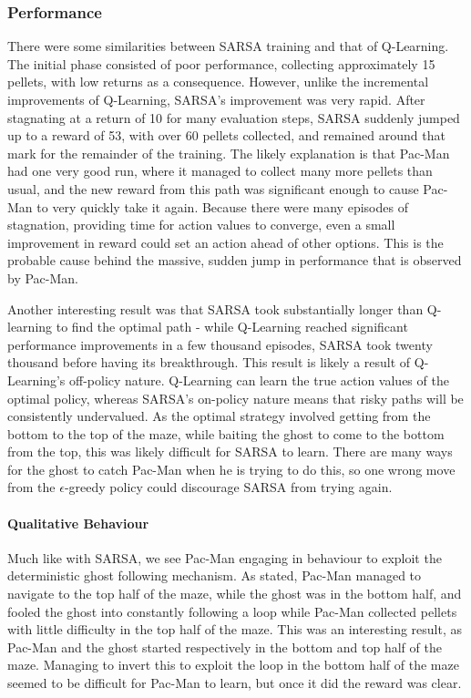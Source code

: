 \documentclass{article}
\begin{document}
\subsubsection{Performance}
There were some similarities between SARSA training and that of Q-Learning. The initial phase consisted of poor performance, collecting approximately 15 pellets, with low returns as a consequence. However, unlike the incremental improvements of Q-Learning, SARSA's improvement was very rapid. After stagnating at a return of 10 for many evaluation steps, SARSA suddenly jumped up to a reward of 53, with over 60 pellets collected, and remained around that mark for the remainder of the training. The likely explanation is that Pac-Man had one very good run, where it managed to collect many more pellets than usual, and the new reward from this path was significant enough to cause Pac-Man to very quickly take it again. Because there were many episodes of stagnation, providing time for action values to converge, even a small improvement in reward could set an action ahead of other options. This is the probable cause behind the massive, sudden jump in performance that is observed by Pac-Man. 

Another interesting result was that SARSA took substantially longer than Q-learning to find the optimal path - while Q-Learning reached significant performance improvements in a few thousand episodes, SARSA took twenty thousand before having its breakthrough. This result is likely a result of Q-Learning's off-policy nature. Q-Learning can learn the true action values of the optimal policy, whereas SARSA's on-policy nature means that risky paths will be consistently undervalued. As the optimal strategy involved getting from the bottom to the top of the maze, while baiting the ghost to come to the bottom from the top, this was likely difficult for SARSA to learn. There are many ways for the ghost to catch Pac-Man when he is trying to do this, so one wrong move from the $\epsilon$-greedy policy could discourage SARSA from trying again. 

\paragraph{Qualitative Behaviour} Much like with SARSA, we see Pac-Man engaging in behaviour to exploit the deterministic ghost following mechanism. As stated, Pac-Man managed to navigate to the top half of the maze, while the ghost was in the bottom half, and fooled the ghost into constantly following a loop while Pac-Man collected pellets with little difficulty in the top half of the maze. This was an interesting result, as Pac-Man and the ghost started respectively in the bottom and top half of the maze. Managing to invert this to exploit the loop in the bottom half of the maze seemed to be difficult for Pac-Man to learn, but once it did the reward was clear. 
\end{document}
